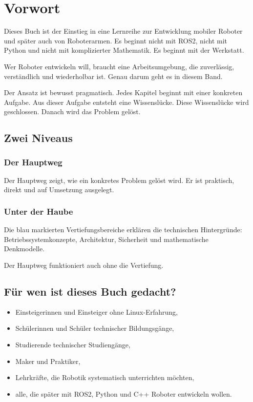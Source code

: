 \documentclass[
  11pt, a4paper, oneside,
  parskip=half, headings=normal,
  bibliography=totoc, listof=totoc
]{scrbook}
\begin{document}

\frontmatter



\chapter*{Vorwort}

Dieses Buch ist der Einstieg in eine Lernreihe zur Entwicklung mobiler Roboter
und später auch von Roboterarmen. Es beginnt nicht mit ROS2, nicht mit Python
und nicht mit komplizierter Mathematik. Es beginnt mit der Werkstatt.

Wer Roboter entwickeln will, braucht eine Arbeitsumgebung, die zuverlässig,
verständlich und wiederholbar ist. Genau darum geht es in diesem Band.

Der Ansatz ist bewusst pragmatisch. Jedes Kapitel beginnt mit einer konkreten
Aufgabe. Aus dieser Aufgabe entsteht eine Wissenslücke. Diese Wissenslücke
wird geschlossen. Danach wird das Problem gelöst.

\section*{Zwei Niveaus}

\subsection*{Der Hauptweg}
Der Hauptweg zeigt, wie ein konkretes Problem gelöst wird. Er ist praktisch,
direkt und auf Umsetzung ausgelegt.

\subsection*{Unter der Haube}
Die blau markierten Vertiefungsbereiche erklären die technischen Hintergründe:
Betriebssystemkonzepte, Architektur, Sicherheit und mathematische Denkmodelle.

Der Hauptweg funktioniert auch ohne die Vertiefung.

\section*{Für wen ist dieses Buch gedacht?}

\begin{itemize}
  \item Einsteigerinnen und Einsteiger ohne Linux-Erfahrung,
  \item Schülerinnen und Schüler technischer Bildungsgänge,
  \item Studierende technischer Studiengänge,
  \item Maker und Praktiker,
  \item Lehrkräfte, die Robotik systematisch unterrichten möchten,
  \item alle, die später mit ROS2, Python und C++ Roboter entwickeln wollen.
\end{itemize}
\end{document}
